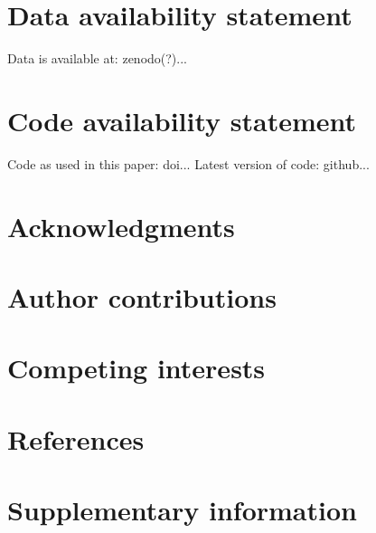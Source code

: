 \documentclass[12pt]{article}
\newcommand{\beginsupplement}{%
        \setcounter{table}{0}
        \renewcommand{\thetable}{S\arabic{table}}%
        \setcounter{figure}{0}
        \renewcommand{\thefigure}{S\arabic{figure}}%
     }
\begin{document}
\section{Data availability statement}

Data is available at: zenodo(?)...

\section{Code availability statement}

Code as used in this paper: doi...
Latest version of code: github...

\section{Acknowledgments}

\section{Author contributions}




\section{Competing interests}

\section{References}




\section{Supplementary information}
\beginsupplement

%
\end{document}

